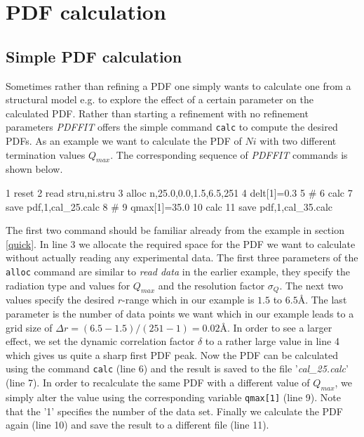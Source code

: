 
\chapter{PDF calculation \label{calc}}
\section{Simple PDF calculation \label{calc_pdf}}

Sometimes rather than refining a PDF one simply wants to calculate
one from a structural model e.g. to explore the effect of a certain
parameter on the calculated PDF. Rather than starting a refinement
with no refinement parameters {\it PDFFIT} offers the simple command
{\tt calc} to compute the desired PDFs. As an example we want to
calculate the PDF of $Ni$ with two different termination values
$Q_{max}$. The corresponding sequence of {\it PDFFIT} commands is
shown below.

\footnotesize
\begin{MacVerbatim}
      1 reset
      2 read stru,ni.stru
      3 alloc n,25.0,0.0,1.5,6.5,251
      4 delt[1]=0.3
      5 #
      6 calc
      7 save pdf,1,cal_25.calc
      8 #
      9 qmax[1]=35.0
     10 calc
     11 save pdf,1,cal_35.calc
\end{MacVerbatim}
\normalsize

\noindent The first two command should be familiar already from
the example in section \ref{quick}. In line 3 we allocate the
required space for the PDF we want to calculate without actually
reading any experimental data. The first three parameters of the
{\tt alloc} command are similar to {\it read data} in the earlier
example, they specify the radiation type and values for $Q_{max}$
and the resolution factor $\sigma_{Q}$. The next two values
specify the desired $r$-range which in our example is $1.5$ to
$6.5$\AA. The last parameter is the number of data points we want
which in our example leads to a grid size of $\Delta r =
(6.5-1.5)/(251-1) = 0.02$\AA. In order to see a larger effect, we
set the dynamic correlation factor $\delta$ to a rather large
value in line 4 which gives us quite a sharp first PDF peak. Now
the PDF can be calculated using the command {\tt calc} (line 6)
and the result is saved to the file '{\it cal\_25.calc}' (line 7).
In order to recalculate the same PDF with a different value of
$Q_{max}$, we simply alter the value using the corresponding
variable {\tt qmax[1]} (line 9). Note that the '1' specifies the
number of the data set. Finally we calculate the PDF again (line
10) and save the result to a different file (line 11).

